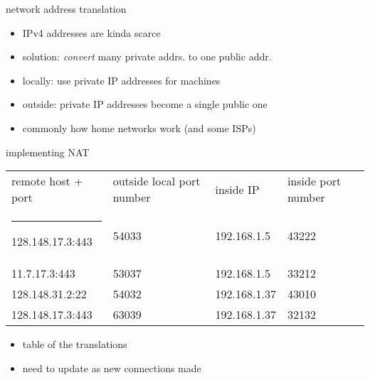 \begin{frame}{network address translation}
\begin{itemize}
\item IPv4 addresses are kinda scarce
\item solution: \textit{convert} many private addrs. to one public addr.
\item locally: use private IP addresses for machines
\item outside: private IP addresses become a single public one
\item commonly how home networks work (and some ISPs)
\end{itemize}
\end{frame}

\begin{frame}{implementing NAT}
\small
\begin{tabular}{llll}
remote host + port & outside local port number & inside IP & inside port number \\ \hrule
128.148.17.3:443 & 54033 & 192.168.1.5 & 43222 \\
11.7.17.3:443 & 53037 & 192.168.1.5 & 33212 \\
128.148.31.2:22 & 54032 & 192.168.1.37 & 43010 \\
128.148.17.3:443 & 63039 & 192.168.1.37 & 32132 \\
\end{tabular}
\begin{itemize}
\item table of the translations
\item need to update as new connections made
\end{itemize}
\end{frame}
